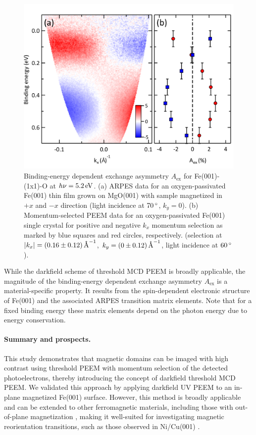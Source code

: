 \documentclass[prl,twocolumn,floatfix,superscriptaddress,aps]{revtex4-2}
\begin{document}
\begin{figure}
    \centering
    \includegraphics[width = 0.9\columnwidth]{FePaperFigARPES2.pdf}
    \caption{Binding-energy dependent exchange asymmetry $A_{\mathrm{ex}}$ for Fe(001)-(1x1)-O at $h\nu = \unit[5.2]{eV}$. (a) ARPES data for an oxygen-passivated Fe(001) thin film grown on MgO(001) with sample magnetized in $+x$ and $-x$ direction (light incidence at $\unit[70]{^{\circ}}$, $k_y = 0$). (b) Momentum-selected PEEM data for an oxygen-passivated Fe(001) single crystal for positive and negative $k_x$ momentum selection as marked by blue squares and red circles, respectively. (selection at $|k_x| = \unit[(0.16 \pm 0.12)]{\text{\AA}^{-1}}$, $k_y = \unit[(0 \pm 0.12)]{\text{\AA}^{-1}}$, light incidence at $\unit[60]{^{\circ}}$).}
    \label{fig:AexContrast}
\end{figure}

While the darkfield scheme of threshold MCD PEEM is broadly applicable, the magnitude of the binding-energy dependent exchange asymmetry $A_{\mathrm{ex}}$ is a material-specific property. It results from the spin-dependent electronic structure of Fe(001) and the associated ARPES  transition matrix elements. Note that for a fixed binding energy these matrix elements depend on the photon energy due to energy conservation.

\paragraph{Summary and prospects.} 
This study demonstrates that magnetic domains can be imaged with high contrast using threshold PEEM with momentum selection of the detected photoelectrons, thereby introducing the concept of darkfield threshold MCD PEEM\@. We validated this approach by applying darkfield UV PEEM to an in-plane magnetized Fe(001) surface. However, this method is broadly applicable and can be extended to other ferromagnetic materials, including those with out-of-plane magnetization \cite{kronseder2011}, making it well-suited for investigating magnetic reorientation transitions, such as those observed in Ni/Cu(001) \cite{henk1999,sander2004,nakagawa2006,kronseder2011}.
\end{document}
